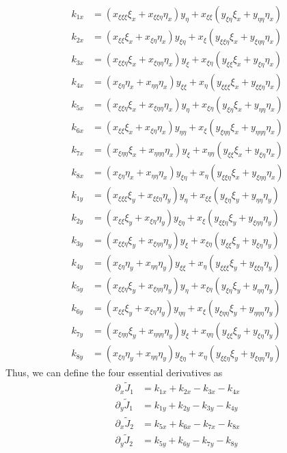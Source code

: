 \documentclass[final,1p,times]{elsarticle}
\begin{document}
\begin{align*}
k_{1x}	&= (x_{\xi\xi\xi}\xi_x+x_{\xi\xi\eta}\eta_x)y_{\eta}+x_{\xi\xi}(y_{\xi\eta}\xi_x+y_{\eta\eta}\eta_x) \\ 
k_{2x}	&= (x_{\xi\xi}\xi_x+x_{\xi\eta}\eta_x)y_{\xi\eta}+x_{\xi}(y_{\xi\xi\eta}\xi_x+y_{\xi\eta\eta}\eta_x) \\
k_{3x}	&= (x_{\xi\xi\eta}\xi_x+x_{\xi\eta\eta}\eta_x)y_{\xi}+x_{\xi\eta}(y_{\xi\xi}\xi_x+y_{\xi\eta}\eta_x) \\
k_{4x}	&= (x_{\xi\eta}\eta_x+x_{\eta\eta}\eta_x)y_{\xi\xi}+x_{\eta}(y_{\xi\xi\xi}\xi_x+y_{\xi\xi\eta}\eta_x) \\
k_{5x}	&= (x_{\xi\xi\eta}\xi_x+x_{\xi\eta\eta}\eta_x)y_{\eta}+x_{\xi\eta}(y_{\xi\eta}\xi_x+y_{\eta\eta}\eta_x) \\
k_{6x}	&= (x_{\xi\xi}\xi_x+x_{\xi\eta}\eta_x)y_{\eta\eta}+x_{\xi}(y_{\xi\eta\eta}\xi_x+y_{\eta\eta\eta}\eta_x) \\
k_{7x}	&= (x_{\xi\eta\eta}\xi_x+x_{\eta\eta\eta}\eta_x)y_{\xi}+x_{\eta\eta}(y_{\xi\xi}\xi_x+y_{\xi\eta}\eta_x) \\
k_{8x}	&= (x_{\xi\eta}\eta_x+x_{\eta\eta}\eta_x)y_{\xi\eta}+x_{\eta}(y_{\xi\xi\eta}\xi_x+y_{\xi\eta\eta}\eta_x) \\
k_{1y}	&= (x_{\xi\xi\xi}\xi_y+x_{\xi\xi\eta}\eta_y)y_{\eta}+x_{\xi\xi}(y_{\xi\eta}\xi_y+y_{\eta\eta}\eta_y) \\
k_{2y}	&= (x_{\xi\xi}\xi_y+x_{\xi\eta}\eta_y)y_{\xi\eta}+x_{\xi}(y_{\xi\xi\eta}\xi_y+y_{\xi\eta\eta}\eta_y) \\
k_{3y}	&= (x_{\xi\xi\eta}\xi_y+x_{\xi\eta\eta}\eta_y)y_{\xi}+x_{\xi\eta}(y_{\xi\xi}\xi_y+y_{\xi\eta}\eta_y) \\
k_{4y}	&= (x_{\xi\eta}\eta_y+x_{\eta\eta}\eta_y)y_{\xi\xi}+x_{\eta}(y_{\xi\xi\xi}\xi_y+y_{\xi\xi\eta}\eta_y) \\
k_{5y}	&= (x_{\xi\xi\eta}\xi_y+x_{\xi\eta\eta}\eta_y)y_{\eta}+x_{\xi\eta}(y_{\xi\eta}\xi_y+y_{\eta\eta}\eta_y) \\
k_{6y}	&= (x_{\xi\xi}\xi_y+x_{\xi\eta}\eta_y)y_{\eta\eta}+x_{\xi}(y_{\xi\eta\eta}\xi_y+y_{\eta\eta\eta}\eta_y) \\
k_{7y}	&= (x_{\xi\eta\eta}\xi_y+x_{\eta\eta\eta}\eta_y)y_{\xi}+x_{\eta\eta}(y_{\xi\xi}\xi_y+y_{\xi\eta}\eta_y) \\
k_{8y}	&= (x_{\xi\eta}\eta_y+x_{\eta\eta}\eta_y)y_{\xi\eta}+x_{\eta}(y_{\xi\xi\eta}\xi_y+y_{\xi\eta\eta}\eta_y) 
\end{align*}
\clearpage\noindent
Thus, we can define the four essential derivatives as
\begin{subequations}
\begin{align}
\partial_x\widetilde{J}_1	&= k_{1x}+k_{2x}-k_{3x}-k_{4x} \\
\partial_y\widetilde{J}_1	&= k_{1y}+k_{2y}-k_{3y}-k_{4y} \\
\partial_x\widetilde{J}_2	&= k_{5x}+k_{6x}-k_{7x}-k_{8x} \\
\partial_y\widetilde{J}_2	&= k_{5y}+k_{6y}-k_{7y}-k_{8y}
\end{align}
\end{subequations}
\end{document}
